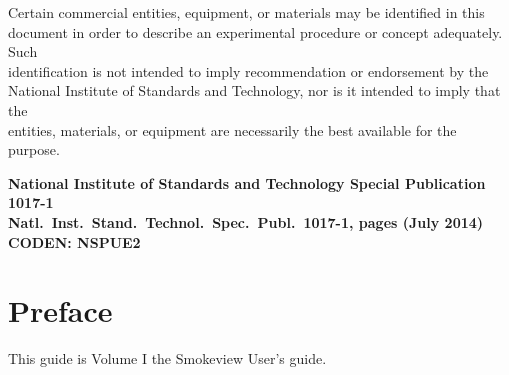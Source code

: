 \documentclass[11pt,twoside]{book}
\begin{document}
\date{}

\setlength{\parindent}{0.25in}

\newpage

\begin{minipage}[t][9in][s]{6.5in}


\begin{flushright}
Certain commercial entities, equipment, or materials may be identified in this \\
document in order to describe an experimental procedure or concept adequately. Such \\
identification is not intended to imply recommendation or endorsement by the \\
National Institute of Standards and Technology, nor is it intended to imply that the \\
entities, materials, or equipment are necessarily the best available for the purpose.
\end{flushright}

\vspace{3in}


\vspace{3in}

\large
\begin{flushright}
\bf National Institute of Standards and Technology Special Publication 1017-1 \\
Natl.~Inst.~Stand.~Technol.~Spec.~Publ.~1017-1, \pageref{LastPage} pages (July 2014) \\
CODEN: NSPUE2
\end{flushright}

\vfill

\end{minipage}


\frontmatter

\pagestyle{plain}


\chapter{Preface}
\smvoverview
This guide is Volume I the  Smokeview User's guide.
\end{document}
